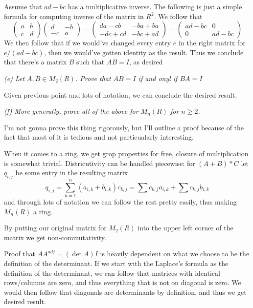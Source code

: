 \documentclass[11pt,oneside,titlepage]{book}
\begin{document}
Assume that $ad - bc$ has a multiplicative inverse. The following is
just a simple formula for computing inverse of the matrix in $R^2$. We
follow that
$$
\begin{pmatrix}
  a & b \\
  c & d
\end{pmatrix}
\begin{pmatrix}
  d & -b \\
  -c & a
\end{pmatrix} =
\begin{pmatrix}
  da - cb & -ba + ba \\
  -dc + cd & -bc + ad 
\end{pmatrix} =
\begin{pmatrix}
  ad - bc & 0 \\
  0 & ad - bc 
\end{pmatrix}
$$
We then follow that if we would've changed every entry $e$ in the
right matrix for $e / (ad - bc)$, then we would've gotten identity as
the result. Thus we conclude that there's a matrix $B$ such that
$AB = I$, as desired

\textit{(e) Let $A, B \in M_2(R)$. Prove that $AB = I$ if and onyl if $BA = I$}

Given previous point and lots of notation, we can conclude the desired result.

\textit{(f) More generally, prove all of the above for $M_n(R)$ for $n \geq 2$.}

I'm not gonna prove this thing rigorously, but I'll outline a proof
because of the fact that most of it is tedious and not particualarly
interesting.

When it comes to a ring, we get grop properties for free, closure of
multiplication is somewhat trivial. Districutivity can be handled piecewise:
for $(A + B) * C$ let $q_{i, j}$ be some entry in the resulting matrix 
$$q_{i, j} = \sum_{k = 1}^{n}{(a_{i, k} + b_{i, k}) c_{k, j} } =
\sum{c_{k, j}a_{i, k}} + \sum{c_{k, j}b_{i, k}}$$
and through lots of notation we can follow the rest pretty easily,
thus making $M_n(R)$ a ring.

By putting our original matrix for $M_2(R)$ into the upper left corner
of the matrix we get non-commutativity.

Proof that $A A^{adj} = (\det A) I$ is heavily dependent on what we
choose to be the definition of the determinant. If we start with the
Laplace's formula as the definition of the determinant, we can follow
that matrices with identical rows/columns are zero, and thus
everything that is not on diagonal is zero. We would then follow that
diagonals are determinants by definition, and thus we get desired result.
\end{document}
